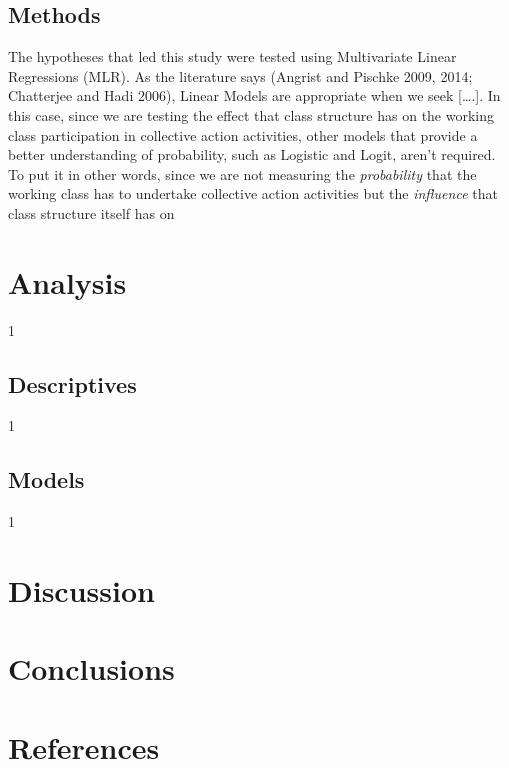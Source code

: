 \documentclass[
]{article}
\begin{document}
\hypertarget{methods}{%
\subsection{Methods}\label{methods}}

The hypotheses that led this study were tested using Multivariate Linear
Regressions (MLR). As the literature says (Angrist and Pischke 2009,
2014; Chatterjee and Hadi 2006), Linear Models are appropriate when we
seek {[}\ldots.{]}. In this case, since we are testing the effect that
class structure has on the working class participation in collective
action activities, other models that provide a better understanding of
probability, such as Logistic and Logit, aren't required. To put it in
other words, since we are not measuring the \emph{probability} that the
working class has to undertake collective action activities but the
\emph{influence} that class structure itself has on

\hypertarget{analysis}{%
\section{Analysis}\label{analysis}}

1

\hypertarget{descriptives}{%
\subsection{Descriptives}\label{descriptives}}

1

\hypertarget{models}{%
\subsection{Models}\label{models}}

1

\hypertarget{discussion}{%
\section{Discussion}\label{discussion}}

\hypertarget{conclusions}{%
\section{Conclusions}\label{conclusions}}

\hypertarget{references}{%
\section*{References}\label{references}}
\end{document}
